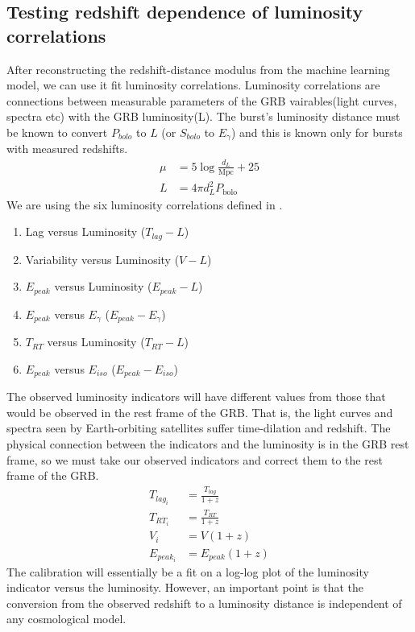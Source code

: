 \subsection{Testing redshift dependence of luminosity correlations}
After reconstructing the redshift-distance modulus from the machine learning model, we can use it fit luminosity correlations. Luminosity correlations are connections between measurable parameters of the GRB vairables(light curves, spectra etc) with the GRB luminosity(L). The burst’s luminosity distance must be known to convert $P_{bolo}$ to $L$ (or $S_{bolo}$ to $E_{\gamma}$) and this is known only for bursts with measured redshifts.
\begin{align}
	\mu &= 5 \log \frac{d_{L}}{\mathrm{Mpc}}+25\\
	L &= 4 \pi d_{L}^{2} P_{\text {bolo }}
\end{align}
We are using the six luminosity correlations defined in \cite{schaefer2007hubble}.
\begin{enumerate}[noitemsep]
\item{Lag versus Luminosity ($T_{lag}-L$)}
\item{Variability versus Luminosity ($V-L$)}
\item{$E_{peak}$ versus Luminosity ($E_{peak}-L$)}
\item{$E_{peak}$ versus $E_{\gamma}$ ($E_{peak}-E_{\gamma}$)}
\item{$T_{RT}$ versus Luminosity ($T_{RT}-L$)}
\item{$E_{peak}$ versus $E_{iso}$ ($E_{peak}-E_{iso}$)}
\end{enumerate}
The observed luminosity indicators will have different values from those that would be observed in the rest frame of the GRB. That is, the light curves and spectra seen by Earth-orbiting satellites suffer time-dilation and redshift. The physical connection between the indicators and the luminosity is in the GRB rest frame, so we must take our observed indicators and correct them to the rest frame of the GRB.
\begin{align}
	T_{lag_i} &= \frac{T_{lag}}{1 + z}\\
	T_{RT_i} &= \frac{T_{RT}}{1 + z}\\
	V_i &= V(1 + z)\\
	E_{peak_i} &= E_{peak}(1 + z)
\end{align}
The calibration will essentially be a fit on a log-log plot of the luminosity indicator versus the luminosity. However, an important point is that the conversion from the observed redshift to a luminosity distance is independent of any cosmological model.
